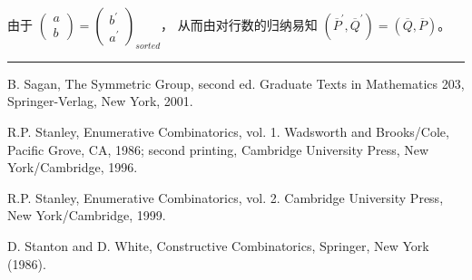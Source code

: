 \documentclass[a4paper,11pt,twoside]{book}
\def\qed{\nopagebreak\hfill{\rule{4pt}{7pt}}\medbreak}
\begin{document}
 由于 $\left(\begin{array}{c}
a\\b\end{array}\right)=\left(\begin{array}{c}
b^{'}\\a^{'}\end{array}\right)_{sorted}$， 从而由对行数的归纳易知
$({\overline{P}}^{'}, \overline{Q}^{'})=(\overline{Q},
\overline{P})$。 \qed





% 
\begin{thebibliography}{99}



B. Sagan, The Symmetric Group, second ed. Graduate Texts in
Mathematics 203, Springer-Verlag, New York, 2001.


R.P. Stanley, Enumerative Combinatorics, vol. 1. Wadsworth and
Brooks/Cole, Pacific Grove, CA, 1986; second printing, Cambridge
University Press, New York/Cambridge, 1996.

R.P. Stanley, Enumerative Combinatorics, vol. 2. Cambridge
University Press, New York/Cambridge, 1999.

D. Stanton and D. White, Constructive Combinatorics, Springer, New York (1986).


\end{thebibliography}
\end{document}
